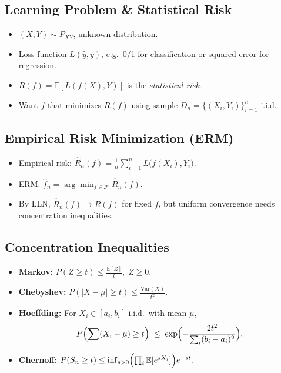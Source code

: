 \documentclass[10pt]{article}
\begin{document}
\begin{multicols}{2}
\subsection*{Learning Problem \& Statistical Risk}
\begin{itemize}
\item $(X,Y)\sim P_{XY}$, unknown distribution.
\item Loss function $L(\hat{y},y)$, e.g.\ 0/1 for classification or squared error for regression.
\item $R(f)=\mathbb{E}[L(f(X),Y)]$ is the \emph{statistical risk}.
\item Want $f$ that minimizes $R(f)$ using sample $D_n=\{(X_i,Y_i)\}_{i=1}^n$ i.i.d.
\end{itemize}

\subsection*{Empirical Risk Minimization (ERM)}
\begin{itemize}
\item Empirical risk: $\hat{R}_n(f)=\frac{1}{n}\sum_{i=1}^n L\bigl(f(X_i),Y_i\bigr)$.
\item ERM: $\hat{f}_n=\arg\min_{f\in\mathcal{F}} \hat{R}_n(f)$.
\item By LLN, $\hat{R}_n(f)\to R(f)$ for fixed $f$, but uniform convergence needs concentration inequalities.
\end{itemize}

\subsection*{Concentration Inequalities}
\begin{itemize}
\item \textbf{Markov:} $P(Z\ge t)\le \frac{\mathbb{E}[Z]}{t}, \; Z\ge0$.
\item \textbf{Chebyshev:} $P(|X-\mu|\ge t)\le \frac{\mathrm{Var}(X)}{t^2}$.
\item \textbf{Hoeffding:} For $X_i\in[a_i,b_i]$ i.i.d.\ with mean $\mu$, 
\[
P\Bigl(\sum (X_i-\mu)\ge t\Bigr)\;\le\;\exp\Bigl(-\frac{2t^2}{\sum_i(b_i-a_i)^2}\Bigr).
\]
\item \textbf{Chernoff:} 
$P(S_n\ge t)\le \inf_{s>0} \Bigl(\prod_i \mathbb{E}[e^{s X_i}]\Bigr) e^{-st}.$
\end{itemize}


\end{multicols}
\end{document}
